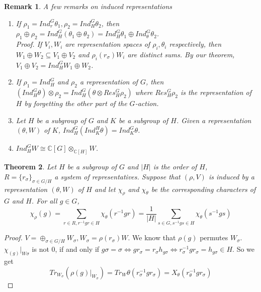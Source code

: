 \documentclass[letterpaper, leqno, 12pt]{article}
\newcommand{\fin}{\qquad \quad \hfill \framebox[1.75mm][l]{\,}}
\newcommand{\bC} {\mathbb{C}}
\newcommand {\repV} {(\rho,V)}
\theoremstyle{stdthm}
\newtheorem{thm}{Theorem}
\theoremstyle{stddef}
\newtheorem{rem}[thm]{Remark} %
\theoremstyle{stdnonum}
\theoremstyle{stdqands}
\theoremstyle{stdbold}
\begin{document}
\begin{rem}
A few remarks on induced representations
\begin{enumerate}
\item If $\rho_1 = Ind_r^G \theta_1, \rho_2 = Ind_H^G\theta_2$, then $\rho_1 \oplus \rho_2 = Ind_H^G (\theta_1 \oplus \theta_2) = Ind_H^G \theta_1 \oplus Ind_\theta^G \theta_2$.\\

\noindent Proof. If $V_i,W_i$ are representation spaces of $\rho_i, \theta_i$ respectively, then $W_1 \oplus W_2 \subseteq V_1 \oplus V_2$ and $\rho_i(r_\sigma)W_i$ are distinct sums. By our theorem, $V_1 \oplus V_2 = Ind_H^G W_1 \oplus W_2$.

\item If $\rho_1 = Ind_H^G$ and $\rho_2$ a representation of $G$, then $(Ind_H^G \theta) \otimes \rho_2 = Ind_H^G (\theta \otimes Res_H^G \rho_2)$ where $Res_H^G \rho_2$ is the representation of $H$ by forgetting the other part of the $G$-action.  

\item Let $H$ be a subgroup of $G$ and $K$ be a subgroup of $H$. Given a representation $(\theta,W)$ of $K$, $Ind_H^G(Ind_K^H \theta) = Ind_K^G \theta$.

\item $Ind_H^G W \cong \bC[G] \otimes_{\bC[H]} W$.  
\end{enumerate}
\end{rem}

\begin{thm}
Let $H$ be a subgroup of $G$ and $|H|$ is the order of $H$, $R = \{r_\sigma\}_{\sigma \in G/H}$ a system of representatives. Suppose that $\repV$ is induced by a representation $(\theta,W)$ of $H$ and let $\chi_\rho$ and $\chi_\theta$ be the corresponding characters of $G$ and $H$. For all $g\in G$, 
\[ \chi_\rho(g) = \sum_{r\in R, r^{-1}gr \in H} \chi_\theta (r^{-1} g r) = \frac{1}{|H|} \sum_{s \in G, s^{-1}gs \in H} \chi_\theta (s^{-1} gs) \]
\end{thm} 

\begin{proof}
$V = \oplus_{\sigma \in G/H} W_\sigma, W_\sigma = \rho(r_\sigma) W$. We know that $\rho(g)$ permutes $W_\sigma$. $\chi_(g)|_{W\sigma}$ is not 0, if and only if $g\sigma = \sigma \Leftrightarrow gr_\sigma = r_\sigma h_{g\sigma} \Leftrightarrow r_{\sigma}^{-1} gr_{\sigma} = h_{g\sigma} \in H$.  So we get 
\[ Tr_{W_\sigma} (\rho(g)|_{W_\sigma}) = Tr_W \theta(r^{-1}_\sigma gr_\sigma) = X_\theta (r_\theta^{-1} gr_\sigma) \]
\end{proof}
\end{document}

